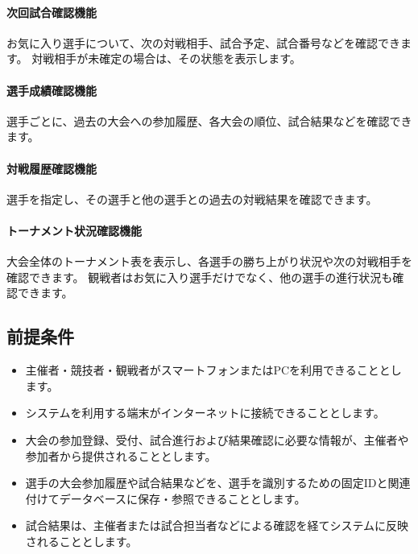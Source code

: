 \paragraph{次回試合確認機能}
お気に入り選手について、次の対戦相手、試合予定、試合番号などを確認できます。
対戦相手が未確定の場合は、その状態を表示します。

\paragraph{選手成績確認機能}
選手ごとに、過去の大会への参加履歴、各大会の順位、試合結果などを確認できます。

\paragraph{対戦履歴確認機能}
選手を指定し、その選手と他の選手との過去の対戦結果を確認できます。

\paragraph{トーナメント状況確認機能}
大会全体のトーナメント表を表示し、各選手の勝ち上がり状況や次の対戦相手を確認できます。
観戦者はお気に入り選手だけでなく、他の選手の進行状況も確認できます。

\subsection{前提条件}
\begin{itemize}
  \item 主催者・競技者・観戦者がスマートフォンまたはPCを利用できることとします。
  \item システムを利用する端末がインターネットに接続できることとします。
  \item 大会の参加登録、受付、試合進行および結果確認に必要な情報が、主催者や参加者から提供されることとします。
  \item 選手の大会参加履歴や試合結果などを、選手を識別するための固定IDと関連付けてデータベースに保存・参照できることとします。
  \item 試合結果は、主催者または試合担当者などによる確認を経てシステムに反映されることとします。
\end{itemize}

